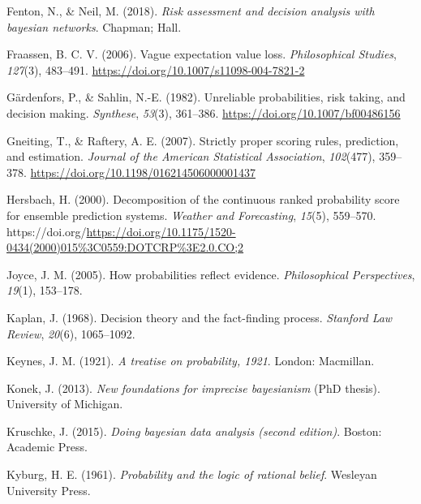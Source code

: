 \documentclass[
  10pt,
  dvipsnames,enabledeprecatedfontcommands]{scrartcl}
\newlength{\cslhangindent}
\newlength{\cslentryspacingunit} %
\newenvironment{CSLReferences}[2] %
 {%
  \setlength{\parindent}{0pt}
  \ifodd #1
  \let\oldpar\par
  \def\par{\hangindent=\cslhangindent\oldpar}
  \fi
  \setlength{\parskip}{#2\cslentryspacingunit}
 }%
 {}
\begin{document}
\begin{CSLReferences}{1}{0}
\leavevmode{}%
Fenton, N., \& Neil, M. (2018). \emph{Risk assessment and decision
analysis with bayesian networks}. Chapman; Hall.

\leavevmode{}%
Fraassen, B. C. V. (2006). Vague expectation value loss.
\emph{Philosophical Studies}, \emph{127}(3), 483--491.
\url{https://doi.org/10.1007/s11098-004-7821-2}

\leavevmode{}%
Gärdenfors, P., \& Sahlin, N.-E. (1982). Unreliable probabilities, risk
taking, and decision making. \emph{Synthese}, \emph{53}(3), 361--386.
\url{https://doi.org/10.1007/bf00486156}

\leavevmode{}%
Gneiting, T., \& Raftery, A. E. (2007). Strictly proper scoring rules,
prediction, and estimation. \emph{Journal of the American Statistical
Association}, \emph{102}(477), 359--378.
\url{https://doi.org/10.1198/016214506000001437}

\leavevmode{}%
Hersbach, H. (2000). Decomposition of the continuous ranked probability
score for ensemble prediction systems. \emph{Weather and Forecasting},
\emph{15}(5), 559--570.
https://doi.org/\url{https://doi.org/10.1175/1520-0434(2000)015\%3C0559:DOTCRP\%3E2.0.CO;2}

\leavevmode{}%
Joyce, J. M. (2005). How probabilities reflect evidence.
\emph{Philosophical Perspectives}, \emph{19}(1), 153--178.

\leavevmode{}%
Kaplan, J. (1968). Decision theory and the fact-finding process.
\emph{Stanford Law Review}, \emph{20}(6), 1065--1092.

\leavevmode{}%
Keynes, J. M. (1921). \emph{A treatise on probability, 1921}. London:
Macmillan.

\leavevmode{}%
Konek, J. (2013). \emph{New foundations for imprecise bayesianism} (PhD
thesis). University of Michigan.

\leavevmode{}%
Kruschke, J. (2015). \emph{Doing bayesian data analysis (second
edition)}. Boston: Academic Press.

\leavevmode{}%
Kyburg, H. E. (1961). \emph{Probability and the logic of rational
belief}. Wesleyan University Press.


\end{CSLReferences}
\end{document}
